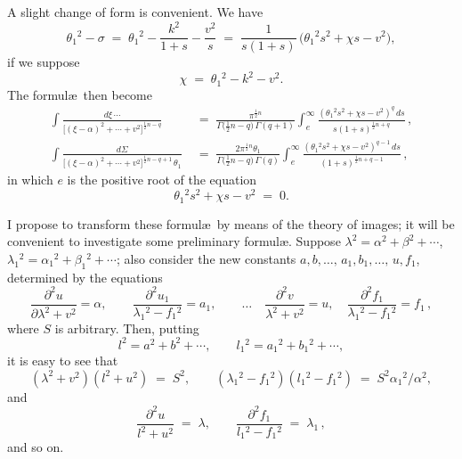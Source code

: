 \documentclass[11pt]{article}
\begin{document}
A slight change of form is convenient. We have
\[
\theta_{1}{}^{2} - \sigma \;=\; \theta_{1}{}^{2} - \frac{k^{2}}{1+s} - \frac{v^{2}}{s} \;=\; \frac{1}{s(1+s)}\,\bigl(\theta_{1}{}^{2}s^{2} + \chi s - v^{2}\bigr),
\]
if we suppose
\[
\chi \;=\; \theta_{1}{}^{2} - k^{2} - v^{2}.
\]
The formul\ae\ then become
\begin{align*}
\int \frac{d\xi\,\cdots}{\bigl[(\xi-\alpha)^{2}+\cdots+v^{2}\bigr]^{\frac{1}{2}n-q}}
 &\;=\; \frac{\pi^{\frac{1}{2}n}}{\Gamma\!\bigl(\tfrac{1}{2}n-q\bigr)\,\Gamma(q+1)}
   \int_{e}^{\infty}\!\frac{(\theta_{1}{}^{2}s^{2} + \chi s - v^{2})^{q}\,ds}{s(1+s)^{\frac{1}{2}n+q}}\,, \\[4pt]
\int \frac{d\Sigma}{\bigl[(\xi-\alpha)^{2}+\cdots+v^{2}\bigr]^{\frac{1}{2}n-q+1}\,\theta_{1}}
 &\;=\; \frac{2\pi^{\frac{1}{2}n}\theta_{1}}{\Gamma\!\bigl(\tfrac{1}{2}n-q\bigr)\,\Gamma(q)}
   \int_{e}^{\infty}\!\frac{(\theta_{1}{}^{2}s^{2} + \chi s - v^{2})^{q-1}\,ds}{(1+s)^{\frac{1}{2}n+q-1}}\,,
\end{align*}
in which $e$ is the positive root of the equation
\[
\theta_{1}{}^{2} s^{2} + \chi s - v^{2} \;=\; 0.
\]

I propose to transform these formul\ae\ by means of the theory of images; it will be convenient to investigate some preliminary formul\ae. Suppose
$\lambda^{2} = \alpha^{2} + \beta^{2} + \cdots$, $\lambda_{1}{}^{2} = \alpha_{1}{}^{2} + \beta_{1}{}^{2} + \cdots$; also consider the new constants $a, b, \ldots,\, a_{1}, b_{1}, \ldots,\, u, f_{1}$, determined by the equations
\[
\frac{\partial^{2}u}{\partial\lambda^{2}+v^{2}}=\alpha,\qquad
\frac{\partial^{2}u_{1}}{\lambda_{1}{}^{2}-f_{1}{}^{2}}=a_{1},\qquad \ldots\quad
\frac{\partial^{2}v}{\lambda^{2}+v^{2}}=u,\quad
\frac{\partial^{2}f_{1}}{\lambda_{1}{}^{2}-f_{1}{}^{2}}=f_{1}\,,
\]
where $S$ is arbitrary. Then, putting
\[
l^{2} = a^{2} + b^{2} + \cdots,\qquad l_{1}{}^{2} = a_{1}{}^{2} + b_{1}{}^{2} + \cdots,
\]
it is easy to see that
\[
(\lambda^{2}+v^{2})(l^{2}+u^{2}) \;=\; S^{2},\qquad (\lambda_{1}{}^{2}-f_{1}{}^{2})(l_{1}{}^{2}-f_{1}{}^{2}) \;=\; S^{2}\alpha_{1}{}^{2}/\alpha^{2},
\]
and
\[
\frac{\partial^{2}u}{l^{2}+u^{2}} \;=\; \lambda,\qquad
\frac{\partial^{2}f_{1}}{l_{1}{}^{2}-f_{1}{}^{2}} \;=\; \lambda_{1}\,,
\]
and so on.
\end{document}
